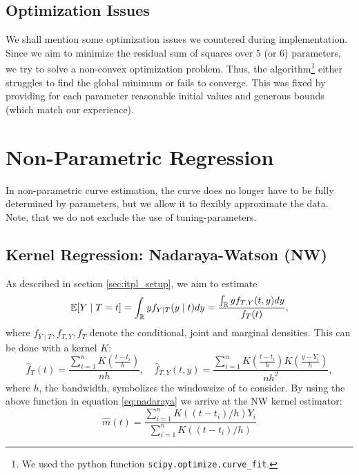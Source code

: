 	\subsection{Optimization Issues}\label{sec:itpl_param_optimizationissues}
		We shall mention some optimization issues we countered during implementation. Since we aim to minimize the residual sum of squares over 5 (or 6) parameters, we try to solve a non-convex optimization problem. Thus, the algorithm\footnote{We used the python function \texttt{scipy.optimize.curve\_fit}.} either struggles to find the global minimum or fails to converge. This was fixed by providing for each parameter reasonable initial values and generous bounds (which match our experience).

\section{Non-Parametric Regression}
	\label{sec:itpl_nonparametric}
	In non-parametric curve estimation, the curve does no longer have to be fully determined by parameters, but we allow it to flexibly approximate the data. Note, that we do not exclude the use of tuning-parameters.

	\subsection{Kernel Regression: Nadaraya-Watson (NW)}
		\label{sec:Kernel}
		As described in section \ref{sec:itpl_setup}, we aim to estimate
		\begin{equation}
			\label{eq:nadaraya}
			\mathbb{E}[Y \mid T=t]
			= \int_{\mathbb{R}} y f_{Y \mid T}(y \mid t) d y
			=\frac{\int_{\mathbb{R}} y f_{T, Y}(t, y) d y}{f_{T}(t)},
		\end{equation}
		where $f_{Y \mid T}, f_{T, Y}, f_{T}$ denote the conditional, joint and marginal densities.
		This can be done with a kernel $K$:
		\begin{equation}
			\hat{f}_{T}(t)=\frac{\sum_{i=1}^{n} K\left(\frac{t-t_{i}}{h}\right)}{n h}, \quad \hat{f}_{T, Y}(t, y)=\frac{\sum_{i=1}^{n} K\left(\frac{t-t_{i}}{h}\right) K\left(\frac{y-Y_{i}}{h}\right)}{n h^{2}},
			\label{eq:kernel_with_bandwidt}
		\end{equation}
		where $h$, the bandwidth, symbolizes the windowsize of to consider. By using the above function in equation \eqref{eq:nadaraya} we arrive at the NW kernel estimator:
		$$\hat{m}(t)=\frac{\sum_{i=1}^{n} K\left(\left(t-t_{i}\right) / h\right) Y_{i}}{\sum_{i=1}^{n} K\left(\left(t-t_{i}\right) / h\right)}$$

